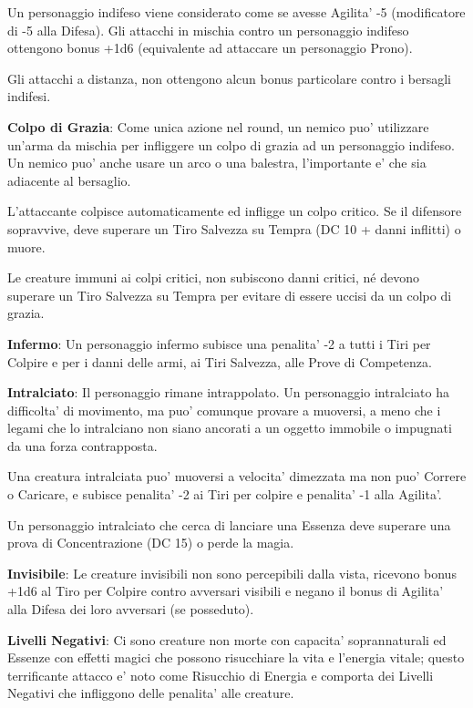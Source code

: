 \documentclass[a4paper,11pt,twoside,openany]{book}
\begin{document}
{Un personaggio indifeso viene considerato come se avesse Agilita' -5 (modificatore di -5 alla Difesa). Gli attacchi in mischia contro un personaggio indifeso ottengono bonus +1d6 (equivalente ad attaccare un personaggio Prono).

Gli attacchi a distanza, non ottengono alcun bonus particolare contro i bersagli indifesi.

\textbf{Colpo di Grazia}: Come unica azione nel round, un nemico puo' utilizzare un'arma da mischia per infliggere un colpo di grazia ad un personaggio indifeso. Un nemico puo' anche usare un arco o una balestra, l'importante e' che sia adiacente al bersaglio.

L'attaccante colpisce automaticamente ed infligge un colpo critico. Se il difensore sopravvive, deve superare un Tiro Salvezza su Tempra (DC 10 + danni inflitti) o muore.

Le creature immuni ai colpi critici, non subiscono danni critici, né devono superare un Tiro Salvezza su Tempra per evitare di essere uccisi da un colpo di grazia.

\textbf{Infermo}: Un personaggio infermo subisce una penalita' -2 a tutti i Tiri per Colpire e per i danni delle armi, ai Tiri Salvezza, alle Prove di Competenza.

\textbf{Intralciato}: Il personaggio rimane intrappolato. Un personaggio intralciato ha difficolta' di movimento, ma puo' comunque provare a muoversi, a meno che i legami che lo intralciano non siano ancorati a un oggetto immobile o impugnati da una forza contrapposta.

Una creatura intralciata puo' muoversi a velocita' dimezzata ma non puo' Correre o Caricare, e subisce penalita' -2 ai Tiri per colpire e penalita' -1 alla Agilita'. 

Un personaggio intralciato che cerca di lanciare una Essenza deve superare una prova di Concentrazione (DC 15) o perde la magia.

\textbf{Invisibile}: Le creature invisibili non sono percepibili dalla vista, ricevono bonus +1d6 al Tiro per Colpire contro avversari visibili e negano il bonus di Agilita' alla Difesa dei loro avversari (se posseduto).

\textbf{Livelli Negativi}: Ci sono creature non morte con capacita' soprannaturali ed Essenze con effetti magici che possono risucchiare la vita e l'energia vitale; questo terrificante attacco e' noto come Risucchio di Energia e comporta dei Livelli Negativi che infliggono delle penalita' alle creature.

}
\end{document}
